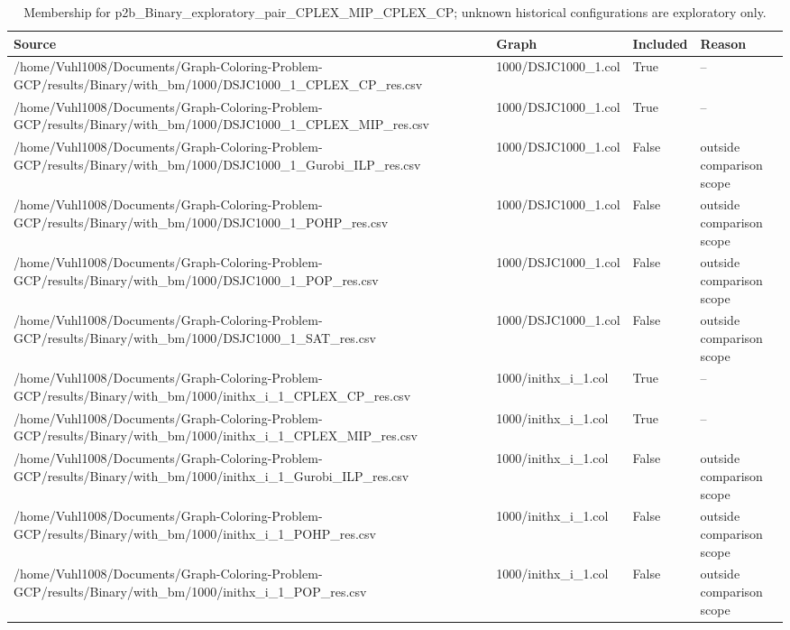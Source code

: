 \begin{table}[htbp]
\centering
\caption{Membership for p2b\_Binary\_exploratory\_pair\_CPLEX\_MIP\_CPLEX\_CP; unknown historical configurations are exploratory only.}
\label{tab:p2b-Binary-exploratory-pair-CPLEX-MIP-CPLEX-CP-membership}
\begin{tabular}{llll}
\hline
Source & Graph & Included & Reason \\
\hline
/home/Vuhl1008/Documents/Graph-Coloring-Problem-GCP/results/Binary/with\_bm/1000/DSJC1000\_1\_CPLEX\_CP\_res.csv & 1000/DSJC1000\_1.col & True & -- \\
/home/Vuhl1008/Documents/Graph-Coloring-Problem-GCP/results/Binary/with\_bm/1000/DSJC1000\_1\_CPLEX\_MIP\_res.csv & 1000/DSJC1000\_1.col & True & -- \\
/home/Vuhl1008/Documents/Graph-Coloring-Problem-GCP/results/Binary/with\_bm/1000/DSJC1000\_1\_Gurobi\_ILP\_res.csv & 1000/DSJC1000\_1.col & False & outside comparison scope \\
/home/Vuhl1008/Documents/Graph-Coloring-Problem-GCP/results/Binary/with\_bm/1000/DSJC1000\_1\_POHP\_res.csv & 1000/DSJC1000\_1.col & False & outside comparison scope \\
/home/Vuhl1008/Documents/Graph-Coloring-Problem-GCP/results/Binary/with\_bm/1000/DSJC1000\_1\_POP\_res.csv & 1000/DSJC1000\_1.col & False & outside comparison scope \\
/home/Vuhl1008/Documents/Graph-Coloring-Problem-GCP/results/Binary/with\_bm/1000/DSJC1000\_1\_SAT\_res.csv & 1000/DSJC1000\_1.col & False & outside comparison scope \\
/home/Vuhl1008/Documents/Graph-Coloring-Problem-GCP/results/Binary/with\_bm/1000/inithx\_i\_1\_CPLEX\_CP\_res.csv & 1000/inithx\_i\_1.col & True & -- \\
/home/Vuhl1008/Documents/Graph-Coloring-Problem-GCP/results/Binary/with\_bm/1000/inithx\_i\_1\_CPLEX\_MIP\_res.csv & 1000/inithx\_i\_1.col & True & -- \\
/home/Vuhl1008/Documents/Graph-Coloring-Problem-GCP/results/Binary/with\_bm/1000/inithx\_i\_1\_Gurobi\_ILP\_res.csv & 1000/inithx\_i\_1.col & False & outside comparison scope \\
/home/Vuhl1008/Documents/Graph-Coloring-Problem-GCP/results/Binary/with\_bm/1000/inithx\_i\_1\_POHP\_res.csv & 1000/inithx\_i\_1.col & False & outside comparison scope \\
/home/Vuhl1008/Documents/Graph-Coloring-Problem-GCP/results/Binary/with\_bm/1000/inithx\_i\_1\_POP\_res.csv & 1000/inithx\_i\_1.col & False & outside comparison scope \\

\end{tabular}
\end{table}
